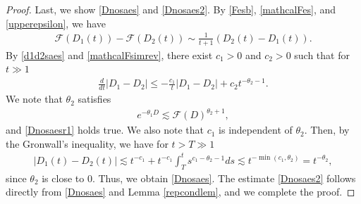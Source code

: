 \documentclass[10pt,a4paper]{amsart}
\begin{document}
\begin{proof}
Last, we show \eqref{Dnosaes} and \eqref{Dnosaes2}. By \eqref{Fesb}, \eqref{mathcalFes}, and \eqref{upperepsilon}, we have
\begin{align}\label{mathcalFsimrev}
\mathcal{F}(D_1(t))-\mathcal{F}(D_2(t))\sim \frac{1}{t+1}\left(D_2(t)-D_1(t)\right).
\end{align}
By \eqref{d1d2saes} and \eqref{mathcalFsimrev}, there exist $c_1>0$ and $c_2>0$ such that for $t\gg 1$ 
\begin{align}\label{Dnosaesr1}
\frac{d}{dt}|D_1-D_2|\leq -\frac{c_1}{t}|D_1-D_2|+c_2t^{-\theta_2-1}.
\end{align}
We note that $\theta_2$ satisfies
\begin{align*}
e^{-\theta_1 D}\lesssim \mathcal{F}(D)^{\theta_2+1},
\end{align*}
and \eqref{Dnosaesr1} holds true. We also note that $c_1$ is independent of $\theta_2$. Then, by the Gronwall's inequality, we have for $t>T\gg 1$
\begin{align*}
|D_1(t)-D_2(t)|\lesssim t^{-c_1}+t^{-c_1}\int_T^t s^{c_1-\theta_2-1}ds\lesssim t^{-\min{(c_1,\theta_2)}}=t^{-\theta_2},
\end{align*}
since $\theta_2$ is close to $0$. Thus, we obtain \eqref{Dnosaes}. The estimate \eqref{Dnosaes2} follows directly from \eqref{Dnosaes} and Lemma \ref{repcondlem}, and we complete the proof.
\end{proof}
\end{document}
